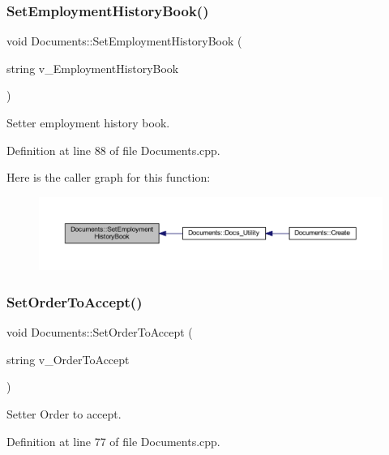 \subsubsection{\texorpdfstring{Set\+Employment\+History\+Book()}{SetEmploymentHistoryBook()}}
{\footnotesize\ttfamily void Documents\+::\+Set\+Employment\+History\+Book (\begin{DoxyParamCaption}\item[{string}]{v\+\_\+\+Employment\+History\+Book }\end{DoxyParamCaption})}



Setter employment history book. 



Definition at line 88 of file Documents.\+cpp.

Here is the caller graph for this function\+:
\nopagebreak
\begin{figure}[H]
\begin{center}
\leavevmode
\includegraphics[width=350pt]{class_documents_a49f95590b3808cdada6632f702213bfa_icgraph}
\end{center}
\end{figure}
\mbox{\label{class_documents_aa101f46efd37c76443f90822407bcaa3}} 
\subsubsection{\texorpdfstring{Set\+Order\+To\+Accept()}{SetOrderToAccept()}}
{\footnotesize\ttfamily void Documents\+::\+Set\+Order\+To\+Accept (\begin{DoxyParamCaption}\item[{string}]{v\+\_\+\+Order\+To\+Accept }\end{DoxyParamCaption})}



Setter Order to accept. 



Definition at line 77 of file Documents.\+cpp.

